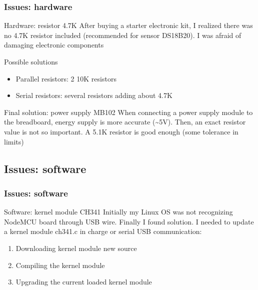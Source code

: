 \documentclass[
    aspectratio=169,                   %
]{beamer}
\begin{document}
    \begin{frame}
        \frametitle{Issues: hardware}

        \begin{block}{Hardware: resistor 4.7K}
            After buying a starter electronic kit, I realized there was no 4.7K resistor included (recommended\cite{resistor} for sensor DS18B20). I was afraid of damaging electronic components
        \end{block}

        \begin{block}{Possible solutions}
            \begin{itemize}
                \item \alert{Parallel resistors}: 2 10K resistors
                \item \alert{Serial resistors}: several resistors adding about 4.7K
            \end{itemize}
        \end{block}

        \begin{block}{Final solution: power supply MB102}
            When connecting a power supply module to the breadboard, energy supply is more accurate (\sim5V). Then, an exact resistor value is not so important. A 5.1K resistor is good enough (some tolerance in limits)
        \end{block}

    \end{frame}

\subsection{Issues: software}

    \begin{frame}
        \frametitle{Issues: software}

        \begin{block}{Software: kernel module CH341}
            Initially my Linux OS was not recognizing NodeMCU board through USB wire. Finally I found solution.\cite{ch341} I needed to update a kernel module \alert{ch341.c} in charge or serial USB communication:
            \begin{enumerate}
                \item Downloading kernel module new source
                \item Compiling the kernel module
                \item Upgrading the current loaded kernel module
            \end{enumerate}
        \end{block}


    \end{frame}
\end{document}
